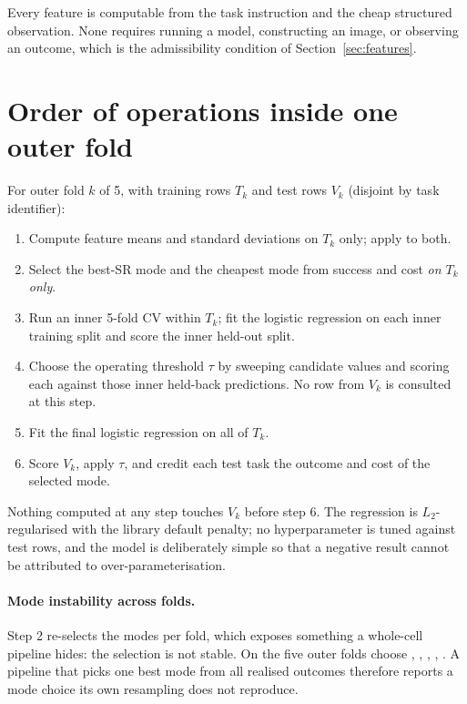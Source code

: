 Every feature is computable from the task instruction and the cheap structured
observation. None requires running a model, constructing an image, or observing an outcome, which is the admissibility condition of
Section~\ref{sec:features}.

\FloatBarrier
\section{Order of operations inside one outer fold}

For outer fold $k$ of 5, with training rows $T_k$ and test rows $V_k$
(disjoint by task identifier):

\begin{enumerate}
\item Compute feature means and standard deviations on $T_k$ only; apply to both.
\item Select the best-SR mode and the cheapest mode from success and cost
      \emph{on $T_k$ only}.
\item Run an inner 5-fold CV within $T_k$; fit the logistic regression on each
      inner training split and score the inner held-out split.
\item Choose the operating threshold $\tau$ by sweeping candidate values and
scoring each against those inner held-back predictions. No row from $V_k$ is
consulted at this step.
\item Fit the final logistic regression on all of $T_k$.
\item Score $V_k$, apply $\tau$, and credit each test task the outcome and cost
      of the selected mode.
\end{enumerate}

Nothing computed at any step touches $V_k$ before step 6. The regression is
$L_2$-regularised with the library default penalty; no hyperparameter is tuned
against test rows, and the model is deliberately simple so that a negative
result cannot be attributed to over-parameterisation.

\paragraph{Mode instability across folds.} Step 2 re-selects the modes per fold,
which exposes something a whole-cell pipeline hides: the selection is not
stable. On  the five outer folds choose \mDOM{}, \mDOM{},
\mSoM{}, \mSoM{}, \mDOM{}. A pipeline that picks one best mode from all realised
outcomes therefore reports a mode choice its own resampling does not reproduce.

